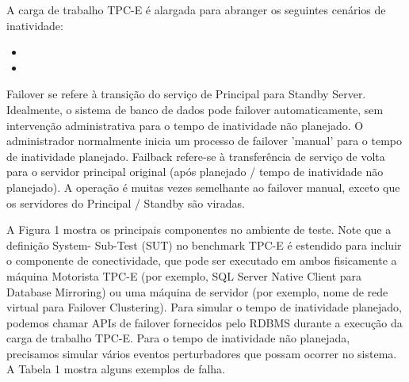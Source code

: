 
A carga de trabalho TPC-E é alargada para abranger os seguintes cenários de inatividade:
\begin{itemize}
	\item %
	\item %
\end{itemize}

Failover se refere à transição do serviço de Principal para Standby Server. Idealmente, o sistema de banco de dados pode failover automaticamente, sem intervenção administrativa para o tempo de inatividade não planejado. O administrador normalmente inicia um processo de failover 'manual' para o tempo de inatividade planejado. Failback refere-se à transferência de serviço de volta para o servidor principal original (após planejado / tempo de inatividade não planejado). A operação é muitas vezes semelhante ao failover manual, exceto que os servidores do Principal / Standby são viradas.

A Figura 1 mostra os principais componentes no ambiente de teste. Note que a definição System- Sub-Test (SUT) no benchmark TPC-E é estendido para incluir o componente de conectividade, que pode ser executado em ambos fisicamente a máquina Motorista TPC-E (por exemplo, SQL Server Native Client para Database Mirroring) ou uma máquina de servidor (por exemplo, nome de rede virtual para Failover Clustering).
Para simular o tempo de inatividade planejado, podemos chamar APIs de failover fornecidos pelo RDBMS durante a execução da carga de trabalho TPC-E. Para o tempo de inatividade não planejada, precisamos simular vários eventos perturbadores que possam ocorrer no sistema. A Tabela 1 mostra alguns exemplos de falha.

